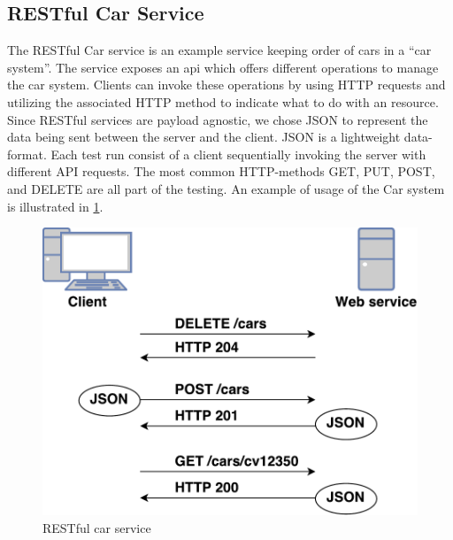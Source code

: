 \subsection{RESTful Car Service}

The RESTful Car service is an example service keeping order of cars in a ``car
system''. The service exposes an \gls{api} which offers different operations to
manage the car system. Clients can invoke these operations by using HTTP
requests and utilizing the associated HTTP method to indicate what to do with an
resource. Since RESTful services are payload agnostic, we chose JSON to
represent the data being sent between the server and the client. JSON is a
lightweight data-format. Each test run consist of a client sequentially invoking
the server with different API requests. The most common HTTP-methods GET, PUT,
POST, and DELETE are all part of the testing. An example of usage of the Car
system is illustrated in \cref{figure-rest-flow}.

\begin{figure}[h]
\centering
\includegraphics[scale=0.6]{images/rest_flow.pdf}
\caption{RESTful car service}
\label{figure-rest-flow}
\end{figure}

